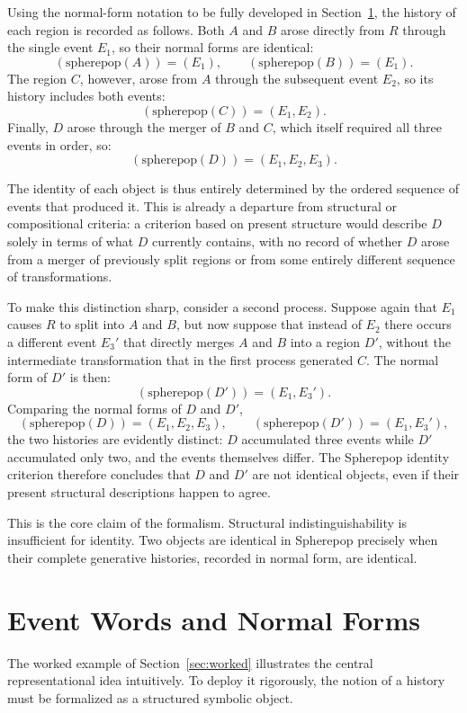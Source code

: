 \documentclass[12pt]{article}
\theoremstyle{plain}
\theoremstyle{definition}
\theoremstyle{remark}
\begin{document}
Using the normal-form notation to be fully developed in
Section~\ref{sec:eventwords}, the history of each region is recorded as
follows.  Both $A$ and $B$ arose directly from $R$ through the single event
$E_1$, so their normal forms are identical:
\[
  (\text{spherepop}(A)) = (E_1), \qquad (\text{spherepop}(B)) = (E_1).
\]
The region $C$, however, arose from $A$ through the subsequent event $E_2$,
so its history includes both events:
\[
  (\text{spherepop}(C)) = (E_1, E_2).
\]
Finally, $D$ arose through the merger of $B$ and $C$, which itself required
all three events in order, so:
\[
  (\text{spherepop}(D)) = (E_1, E_2, E_3).
\]

The identity of each object is thus entirely determined by the ordered
sequence of events that produced it.  This is already a departure from
structural or compositional criteria: a criterion based on present structure
would describe $D$ solely in terms of what $D$ currently contains, with no
record of whether $D$ arose from a merger of previously split regions or from
some entirely different sequence of transformations.

To make this distinction sharp, consider a second process.  Suppose again
that $E_1$ causes $R$ to split into $A$ and $B$, but now suppose that instead
of $E_2$ there occurs a different event $E_3'$ that directly merges $A$ and
$B$ into a region $D'$, without the intermediate transformation that in the
first process generated $C$.  The normal form of $D'$ is then:
\[
  (\text{spherepop}(D')) = (E_1, E_3').
\]
Comparing the normal forms of $D$ and $D'$,
\[
  (\text{spherepop}(D)) = (E_1, E_2, E_3), \qquad
  (\text{spherepop}(D')) = (E_1, E_3'),
\]
the two histories are evidently distinct: $D$ accumulated three events while
$D'$ accumulated only two, and the events themselves differ.  The Spherepop
identity criterion therefore concludes that $D$ and $D'$ are not identical
objects, even if their present structural descriptions happen to agree.

This is the core claim of the formalism.  Structural indistinguishability is
insufficient for identity.  Two objects are identical in Spherepop precisely
when their complete generative histories, recorded in normal form, are
identical.


\section{Event Words and Normal Forms}
\label{sec:eventwords}

The worked example of Section~\ref{sec:worked} illustrates the central
representational idea intuitively.  To deploy it rigorously, the notion of a
history must be formalized as a structured symbolic object.
\end{document}
